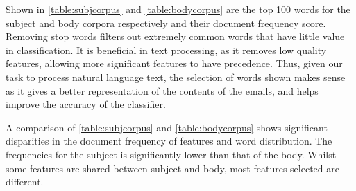 \documentclass[10pt, a4paper]{article}
\begin{document}
Shown in \autoref{table:subjcorpus} and \autoref{table:bodycorpus} are the top 100 words for the subject and body corpora respectively and their document frequency score. Removing stop words filters out extremely common words that have little value in classification. It is beneficial in text processing, as it removes low quality features, allowing more significant features to have precedence. Thus, given our task to process natural language text, the selection of words shown makes sense as it gives a better representation of the contents of the emails, and helps improve the accuracy of the classifier.

A comparison of \autoref{table:subjcorpus} and \autoref{table:bodycorpus} shows significant disparities in the document frequency of features and word distribution. The frequencies for the subject is significantly lower than that of the body. Whilst some features are shared between subject and body, most features selected are different.
\end{document}
